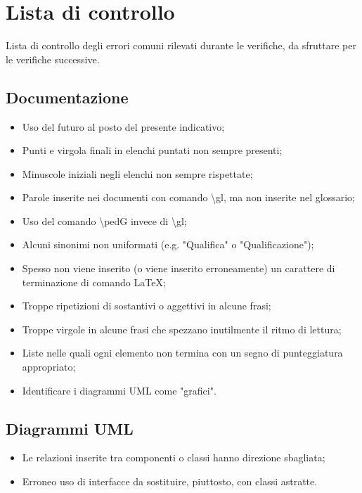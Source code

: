 \documentclass[../NormeDiProgetto.tex]{subfiles}
\begin{document}
	\section{Lista di controllo}
		Lista di controllo degli errori comuni rilevati durante le verifiche, da sfruttare per le verifiche
		successive.
		\subsection{Documentazione}
			\begin{itemize}
				\item Uso del futuro al posto del presente indicativo;
				\item Punti e virgola finali in elenchi puntati non sempre presenti;
				\item Minuscole iniziali negli elenchi non sempre rispettate;
				\item Parole inserite nei documenti con comando \textbackslash gl, ma non inserite nel glossario;
				\item Uso del comando \textbackslash ped{G} invece di \textbackslash gl;
				\item Alcuni sinonimi non uniformati (e.g. "Qualifica" o "Qualificazione");
				\item Spesso non viene inserito (o viene inserito erroneamente) un carattere di terminazione di
				comando \LaTeX;
				\item Troppe ripetizioni di sostantivi o aggettivi in alcune frasi;
				\item Troppe virgole in alcune frasi che spezzano inutilmente il ritmo di lettura;
				\item Liste nelle quali ogni elemento non termina con un segno di punteggiatura appropriato;
				\item Identificare i diagrammi UML come "grafici".
			\end{itemize}
		\subsection{Diagrammi UML}
			\begin{itemize}
				\item Le relazioni inserite tra componenti o classi hanno direzione sbagliata;
				\item Erroneo uso di interfacce da sostituire, piuttosto, con classi astratte.
			\end{itemize}
\end{document}
